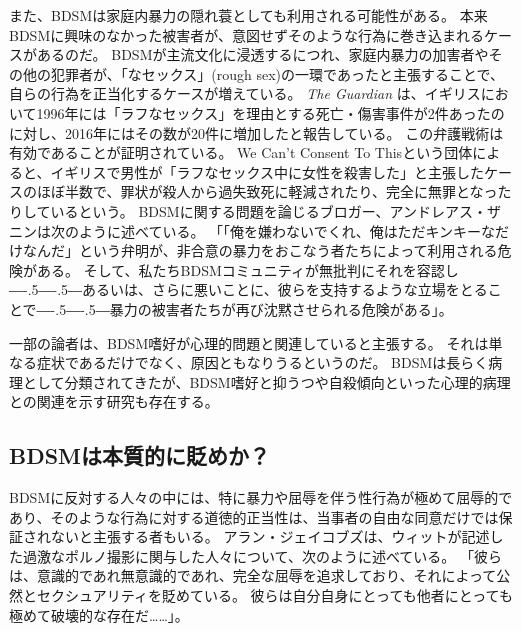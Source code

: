 \documentclass[paper=a4,book,openany]{jlreq}
\def\DDASH{―\kern-.5\zw―\kern-.5\zw―}
\begin{document}
また、BDSMは家庭内暴力の隠れ蓑としても利用される可能性がある。
本来BDSMに興味のなかった被害者が、意図せずそのような行為に巻き込まれるケースがあるのだ。
BDSMが主流文化に浸透するにつれ、家庭内暴力の加害者やその他の犯罪者が、「なセックス」(rough sex)の一環であったと主張することで、自らの行為を正当化するケースが増えている。
\emph{The Guardian} は、イギリスにおいて1996年には「ラフなセックス」を理由とする死亡・傷害事件が2件あったのに対し、2016年にはその数が20件に増加したと報告している\citep{grierson20:_gover_consid_law_curb_use}。
この弁護戦術は有効であることが証明されている。
We Can't Consent To Thisという団体によると、イギリスで男性が「ラフなセックス中に女性を殺害した」と主張したケースのほぼ半数で、罪状が殺人から過失致死に軽減されたり、完全に無罪となったりしているという\citep{harman20:_rough_sex_gone_wrong_defen,woodyatt20:_grace_millan_rise_shades_defen_murder_trial}。
BDSMに関する問題を論じるブロガー、アンドレアス・ザニンは次のように述べている。
「「俺を嫌わないでくれ、俺はただキンキーなだけなんだ」という弁明が、非合意の暴力をおこなう者たちによって利用される危険がある。
そして、私たちBDSMコミュニティが無批判にそれを容認し{\DDASH}あるいは、さらに悪いことに、彼らを支持するような立場をとることで{\DDASH}暴力の被害者たちが再び沈黙させられる危険がある」\citep{zanin14:_poor_persec_perver}。

一部の論者は、BDSM嗜好が心理的問題と関連していると主張する。
それは単なる症状であるだけでなく、原因ともなりうるというのだ。
BDSMは長らく病理として分類されてきたが、BDSM嗜好と抑うつや自殺傾向といった心理的病理との関連を示す研究も存在する\citep{brown17:_suicid_risk_bdsm_pract}。

\subsection{BDSMは本質的に貶めか？}

BDSMに反対する人々の中には、特に暴力や屈辱を伴う性行為が極めて屈辱的であり、そのような行為に対する道徳的正当性は、当事者の自由な同意だけでは保証されないと主張する者もいる。
アラン・ジェイコブズは、ウィットが記述した過激なポルノ撮影に関与した人々について、次のように述べている。
「彼らは、意識的であれ無意識的であれ、完全な屈辱を追求しており、それによって公然とセクシュアリティを貶めている。
彼らは自分自身にとっても他者にとっても極めて破壊的な存在だ……」\citep{jacobs03:_in_which_noah_millm_i}。
\end{document}
